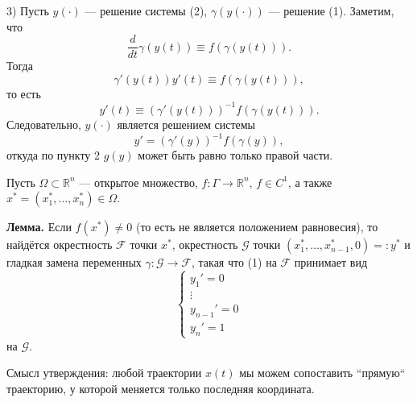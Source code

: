 3) Пусть $y(\cdot)$ --- решение системы (2), $\gamma(y(\cdot))$ --- решение (1).
Заметим, что
\[
    \frac{d}{dt} \gamma(y(t)) \equiv f(\gamma(y(t))).
\]
Тогда
\[
    \gamma'(y(t)) y'(t) \equiv f(\gamma(y(t))),
\]
то есть
\[
    y'(t) \equiv (\gamma'(y(t)))^{-1} f(\gamma(y(t))).
\]
Следовательно, $y(\cdot)$ является решением системы
\[
    y' = (\gamma'(y))^{-1} f(\gamma(y)),
\]
откуда по пункту 2 $g(y)$ может быть равно только правой части.

\QED

Пусть $\Omega \subset \mathbb R^n$ --- открытое множество, $f: \Gamma \to \mathbb R^n$, $f \in C^1$, а также $x^* = (x_1^*, \dots, x_n^*) \in \Omega$.

\textbf{Лемма.} Если $f(x^*) \ne 0$ (то есть не является положением равновесия), то найдётся окрестность $\mathcal F$ точки $x^*$, окрестность $\mathcal G$ точки $(x_1^*, \dots, x_{n-1}^*, 0) =: y^*$ и гладкая замена переменных $\gamma: \mathcal G \to \mathcal F$, такая что (1) на $\mathcal F$ принимает вид
\begin{equation}
    \begin{cases}
        y_1' = 0 \\
        \vdots \\
        y_{n-1}' = 0 \\
        y_n' = 1
    \end{cases}
\end{equation}
на $\mathcal G$.

Смысл утверждения: любой траектории $x(t)$ мы можем сопоставить ``прямую`` траекторию, у которой меняется только последняя координата.

